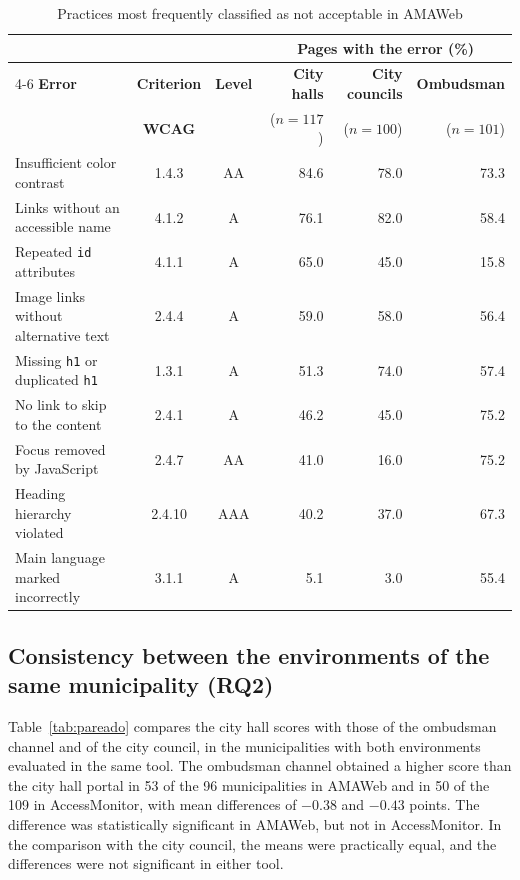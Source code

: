 \documentclass[12pt]{article}
\begin{document}
\begin{table}[ht]
\centering
\caption{Practices most frequently classified as not acceptable in AMAWeb}
\label{tab:erros}
\footnotesize
\setlength{\tabcolsep}{3pt}
\begin{tabular}{lccrrr}
\toprule
 & & & \multicolumn{3}{c}{\textbf{Pages with the error (\%)}} \\
\cmidrule(lr){4-6}
\textbf{Error} & \textbf{Criterion} & \textbf{Level} & \textbf{City halls} & \textbf{City councils} & \textbf{Ombudsman} \\
 & \textbf{WCAG} & & ($n=117$) & ($n=100$) & ($n=101$) \\
\midrule
Insufficient color contrast                       & 1.4.3  & AA  & 84.6 & 78.0 & 73.3 \\
Links without an accessible name                  & 4.1.2  & A   & 76.1 & 82.0 & 58.4 \\
Repeated \texttt{id} attributes                   & 4.1.1  & A   & 65.0 & 45.0 & 15.8 \\
Image links without alternative text              & 2.4.4  & A   & 59.0 & 58.0 & 56.4 \\
Missing \texttt{h1} or duplicated \texttt{h1}     & 1.3.1  & A   & 51.3 & 74.0 & 57.4 \\
No link to skip to the content                    & 2.4.1  & A   & 46.2 & 45.0 & 75.2 \\
Focus removed by JavaScript                       & 2.4.7  & AA  & 41.0 & 16.0 & 75.2 \\
Heading hierarchy violated                        & 2.4.10 & AAA & 40.2 & 37.0 & 67.3 \\
Main language marked incorrectly                  & 3.1.1  & A   &  5.1 &  3.0 & 55.4 \\
\bottomrule
\end{tabular}
\end{table}

\subsection{Consistency between the environments of the same municipality (RQ2)}

Table~\ref{tab:pareado} compares the city hall scores with those of the ombudsman channel and of the city council, in the municipalities with both environments evaluated in the same tool. The ombudsman channel obtained a higher score than the city hall portal in 53 of the 96 municipalities in AMAWeb and in 50 of the 109 in AccessMonitor, with mean differences of $-0.38$ and $-0.43$ points. The difference was statistically significant in AMAWeb, but not in AccessMonitor. In the comparison with the city council, the means were practically equal, and the differences were not significant in either tool.
\end{document}
